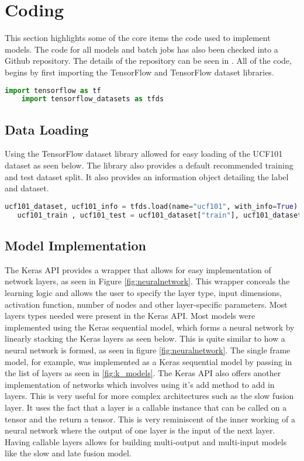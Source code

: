 \chapter{Coding}
\label{coding}
This section highlights some of the core items the code used to implement models. The code for all models and batch jobs has also been checked into a Github repository.  The details of the repository can be seen in \citep{projectGithub}.  
All of the code, begins by first importing the TensorFlow and TensorFlow dataset libraries.

\begin{lstlisting}[language=Python, caption=Importing tensorflow libaries]
    import tensorflow as tf
    import tensorflow_datasets as tfds
\end{lstlisting}

\section{Data Loading}
Using the TensorFlow dataset library allowed for easy loading of the UCF101 dataset as seen below. The library also provides a default recommended training and test dataset split. It also provides an information object detailing the label and dataset.

\begin{lstlisting}[language=Python, caption=Loading UCF101 dataset]
    ucf101_dataset, ucf101_info = tfds.load(name="ucf101", with_info=True)
   ucf101_train , ucf101_test = ucf101_dataset["train"], ucf101_dataset["test"]
\end{lstlisting}

\section{Model Implementation}

The Keras API provides a wrapper that allows for easy implementation of network layers, as seen in Figure \ref{fig:neuralnetwork}. This wrapper conceals the learning logic and allows the user to specify the layer type, input dimensions, activation function, number of nodes and other layer-specific parameters.
Most layers types needed were present in the Keras API. Most models were implemented using the Keras sequential model, which forms a neural network by linearly stacking the Keras layers as seen below. This is quite similar to how a neural network is formed, as seen in figure \ref{fig:neuralnetwork}.  The single frame model, for example, was implemented as a Keras sequential model by passing in the list of layers as seen in \ref{fig:k_models}. The Keras API also offers another implementation of networks which involves using it's add method to add in layers. This is very useful for more complex architectures such as the slow fusion layer. It uses the fact that a layer is a callable instance that can be called on a tensor and the return a tensor. This is very reminiscent of the inner working of a neural network where the output of one layer is the input of the next layer. Having callable layers allows for building multi-output and multi-input models like the slow and late fusion model.

